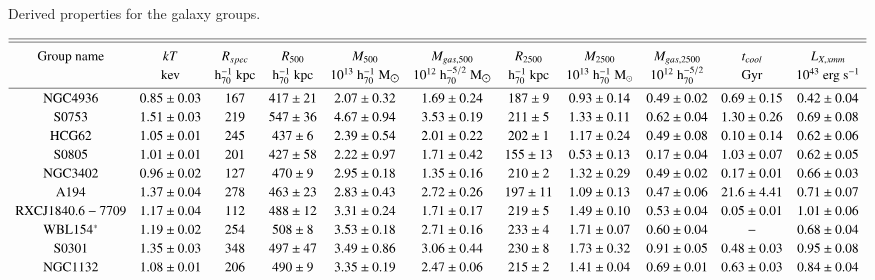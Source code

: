 \documentclass{aa} %
\begin{document}
\begin{table*}[htp]
\caption{Derived properties for the galaxy groups.}
$$
\centering
\setlength\extrarowheight{2pt}
\begin{array}{ccccccccccc}
\hline\hline
\noalign{\smallskip}
{\rm Group \ name}  & kT & R_{spec} & R_{500} & M_{500} & M_{gas,500} & R_{2500}  & M_{2500} & M_{gas,2500} & t_{cool} & L_{X,xmm}\\ 
				   & {\rm kev} & {\rm h^{-1}_{70} \ kpc} & {\rm h^{-1}_{70} \ kpc}  & {\rm 10^{13} \ h^{-1}_{70} \ M_{\sun} } & {\rm 10^{12} \ h^{-5/2}_{70} \ M_{\sun}} & {\rm h^{-1}_{70} \ kpc} & {\rm 10^{13} \ h^{-1}_{70} \ M_{\odot} } & {\rm 10^{12} \ h^{-5/2}_{70}} & {\rm Gyr} & {\rm 10^{43} \ erg \ s^{-1}} \\ 
\noalign{\smallskip}
\hline
{\rm NGC4936} & 0.85\pm0.03 & 167 & 417\pm21 & 2.07\pm0.32 & 1.69\pm0.24 & 187\pm9 & 0.93\pm0.14 & 0.49\pm0.02 & 0.69\pm0.15 & 0.42\pm0.04 \\ 
{\rm S0753}   & 1.51\pm0.03 & 219 & 547\pm36 & 4.67\pm0.94 & 3.53\pm0.19 & 211\pm5 & 1.33\pm0.11 & 0.62\pm0.04 & 1.30\pm0.26 & 0.69\pm0.08  \\ 
{\rm HCG62}   & 1.05\pm0.01 & 245 & 437\pm6 & 2.39\pm0.54 & 2.01\pm0.22 & 202\pm1 & 1.17\pm0.24 & 0.49\pm0.08 & 0.10\pm0.14 & 0.62\pm0.06 \\ 
{\rm S0805}   & 1.01\pm0.01 & 201 & 427\pm58 & 2.22\pm0.97 & 1.71\pm0.42 & 155\pm13 & 0.53\pm0.13 & 0.17\pm0.04 & 1.03\pm0.07 & 0.62\pm0.05 \\ 
{\rm NGC3402} & 0.96\pm0.02 & 127 & 470\pm9 & 2.95\pm0.18 & 1.35\pm0.16 & 210\pm2 & 1.32\pm0.29 & 0.49\pm0.02 & 0.17\pm0.01 & 0.66\pm0.03 \\ 
{\rm A194 }   & 1.37\pm0.04 & 278 & 463\pm23 & 2.83\pm0.43 & 2.72\pm0.26 & 197\pm11 & 1.09\pm0.13 & 0.47\pm0.06 & 21.6\pm4.41 & 0.71\pm0.07 \\ 
{\rm RXCJ1840.6-7709} & 1.17\pm0.04 & 112 & 488\pm12 & 3.31\pm0.24 & 1.71\pm0.17 & 219\pm5 & 1.49\pm0.10 & 0.53\pm0.04 & 0.05\pm0.01 & 1.01\pm0.06 \\ 
{\rm WBL154^{*}} & 1.19\pm0.02 & 254 & 508\pm8 & 3.53\pm0.18 & 2.71\pm0.16 & 233\pm4 & 1.71\pm0.07 & 0.60\pm0.04 & - & 0.68\pm0.04 \\ 
{\rm S0301  } & 1.35\pm0.03 & 348 & 497\pm47 & 3.49\pm0.86 & 3.06\pm0.44 & 230\pm8 & 1.73\pm0.32 & 0.91\pm0.05 & 0.48\pm0.03 & 0.95\pm0.08 \\ 
{\rm NGC1132} & 1.08\pm0.01 & 206 & 490\pm9 & 3.35\pm0.19 & 2.47\pm0.06 & 215\pm2 & 1.41\pm0.04 & 0.69\pm0.01 & 0.63\pm0.03 & 0.84\pm0.04 \\ 

\end{array}$$
\end{table*}
\end{document}
